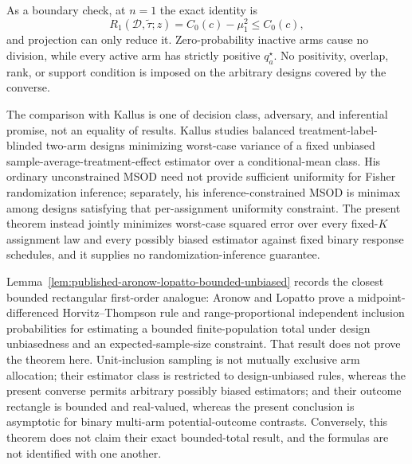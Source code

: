 As a boundary check, at \(n=1\) the exact identity is
\[
 R_1(\mathcal D,\widetilde\tau;z)=C_0(c)-\mu_1^2\leq C_0(c),
\]
and projection can only reduce it.  Zero-probability inactive arms cause no division, while every active arm has strictly positive \(q_a^\star\).  No positivity, overlap, rank, or support condition is imposed on the arbitrary designs covered by the converse.

The comparison with Kallus is one of decision class, adversary, and inferential promise, not an equality of results.  Kallus studies balanced treatment-label-blinded two-arm designs minimizing worst-case variance of a fixed unbiased sample-average-treatment-effect estimator over a conditional-mean class.  His ordinary unconstrained MSOD need not provide sufficient uniformity for Fisher randomization inference; separately, his inference-constrained MSOD is minimax among designs satisfying that per-assignment uniformity constraint.  The present theorem instead jointly minimizes worst-case squared error over every fixed-\(K\) assignment law and every possibly biased estimator against fixed binary response schedules, and it supplies no randomization-inference guarantee.

Lemma~\ref{lem:published-aronow-lopatto-bounded-unbiased} records the closest bounded rectangular first-order analogue: Aronow and Lopatto prove a midpoint-differenced Horvitz--Thompson rule and range-proportional independent inclusion probabilities for estimating a bounded finite-population total under design unbiasedness and an expected-sample-size constraint.  That result does not prove the theorem here.  Unit-inclusion sampling is not mutually exclusive arm allocation; their estimator class is restricted to design-unbiased rules, whereas the present converse permits arbitrary possibly biased estimators; and their outcome rectangle is bounded and real-valued, whereas the present conclusion is asymptotic for binary multi-arm potential-outcome contrasts.  Conversely, this theorem does not claim their exact bounded-total result, and the formulas are not identified with one another.